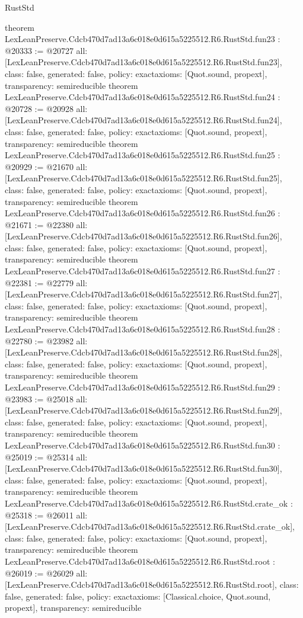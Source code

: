 \begin{lexlean}{RustStd}
\begin{coremodule}
{}
theorem LexLeanPreserve.Cdcb470d7ad13a6c018e0d615a5225512.R6.RustStd.fun23 : @20333 := @20727 {
  all: [LexLeanPreserve.Cdcb470d7ad13a6c018e0d615a5225512.R6.RustStd.fun23],
  class: false,
  generated: false,
  policy: exact{axioms: [Quot.sound, propext]},
  transparency: semireducible
}
theorem LexLeanPreserve.Cdcb470d7ad13a6c018e0d615a5225512.R6.RustStd.fun24 : @20728 := @20928 {
  all: [LexLeanPreserve.Cdcb470d7ad13a6c018e0d615a5225512.R6.RustStd.fun24],
  class: false,
  generated: false,
  policy: exact{axioms: [Quot.sound, propext]},
  transparency: semireducible
}
theorem LexLeanPreserve.Cdcb470d7ad13a6c018e0d615a5225512.R6.RustStd.fun25 : @20929 := @21670 {
  all: [LexLeanPreserve.Cdcb470d7ad13a6c018e0d615a5225512.R6.RustStd.fun25],
  class: false,
  generated: false,
  policy: exact{axioms: [Quot.sound, propext]},
  transparency: semireducible
}
theorem LexLeanPreserve.Cdcb470d7ad13a6c018e0d615a5225512.R6.RustStd.fun26 : @21671 := @22380 {
  all: [LexLeanPreserve.Cdcb470d7ad13a6c018e0d615a5225512.R6.RustStd.fun26],
  class: false,
  generated: false,
  policy: exact{axioms: [Quot.sound, propext]},
  transparency: semireducible
}
theorem LexLeanPreserve.Cdcb470d7ad13a6c018e0d615a5225512.R6.RustStd.fun27 : @22381 := @22779 {
  all: [LexLeanPreserve.Cdcb470d7ad13a6c018e0d615a5225512.R6.RustStd.fun27],
  class: false,
  generated: false,
  policy: exact{axioms: [Quot.sound, propext]},
  transparency: semireducible
}
theorem LexLeanPreserve.Cdcb470d7ad13a6c018e0d615a5225512.R6.RustStd.fun28 : @22780 := @23982 {
  all: [LexLeanPreserve.Cdcb470d7ad13a6c018e0d615a5225512.R6.RustStd.fun28],
  class: false,
  generated: false,
  policy: exact{axioms: [Quot.sound, propext]},
  transparency: semireducible
}
theorem LexLeanPreserve.Cdcb470d7ad13a6c018e0d615a5225512.R6.RustStd.fun29 : @23983 := @25018 {
  all: [LexLeanPreserve.Cdcb470d7ad13a6c018e0d615a5225512.R6.RustStd.fun29],
  class: false,
  generated: false,
  policy: exact{axioms: [Quot.sound, propext]},
  transparency: semireducible
}
theorem LexLeanPreserve.Cdcb470d7ad13a6c018e0d615a5225512.R6.RustStd.fun30 : @25019 := @25314 {
  all: [LexLeanPreserve.Cdcb470d7ad13a6c018e0d615a5225512.R6.RustStd.fun30],
  class: false,
  generated: false,
  policy: exact{axioms: [Quot.sound, propext]},
  transparency: semireducible
}
theorem LexLeanPreserve.Cdcb470d7ad13a6c018e0d615a5225512.R6.RustStd.crate_ok : @25318 := @26011 {
  all: [LexLeanPreserve.Cdcb470d7ad13a6c018e0d615a5225512.R6.RustStd.crate_ok],
  class: false,
  generated: false,
  policy: exact{axioms: [Quot.sound, propext]},
  transparency: semireducible
}
theorem LexLeanPreserve.Cdcb470d7ad13a6c018e0d615a5225512.R6.RustStd.root : @26019 := @26029 {
  all: [LexLeanPreserve.Cdcb470d7ad13a6c018e0d615a5225512.R6.RustStd.root],
  class: false,
  generated: false,
  policy: exact{axioms: [Classical.choice, Quot.sound, propext]},
  transparency: semireducible
}


\end{coremodule}
\end{lexlean}
